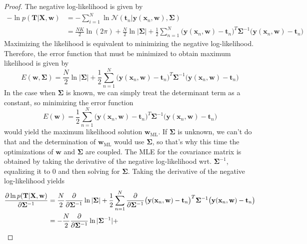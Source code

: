 \begin{proof}
    The negative log-likelihood is given by
    \begin{align*}
    -\ln p(\mathbf{T} | \mathbf{X}, \mathbf{w})
    &= -\sum_{i=1}^{N} \ln \mathcal{N}(\mathbf{t}_n | \mathbf{y}(\mathbf{x}_n, \mathbf{w}), \mathbf{\Sigma}) \\
    &= \frac{NK}{2} \ln(2\pi) + \frac{N}{2} \ln|\mathbf{\Sigma}| 
    + \frac{1}{2}  \sum_{n=1}^{N} \big(\mathbf{y}(\mathbf{x}_n, \mathbf{w}) - \mathbf{t}_n\big)^T
    \mathbf{\Sigma}^{-1}\big(\mathbf{y}(\mathbf{x}_n, \mathbf{w}) - \mathbf{t}_n\big)
    \end{align*}
    Maximizing the likelihood is equivalent to minimizing the negative
    log-likelihood. Therefore, the error function that must be minimized
    to obtain maximum likelihood is given by
    \[
        E(\mathbf{w}, \mathbf{\Sigma}) 
        = \frac{N}{2} \ln|\mathbf{\Sigma}|
        + \frac{1}{2}  \sum_{n=1}^{N} \big(\mathbf{y}(\mathbf{x}_n, \mathbf{w}) - \mathbf{t}_n\big)^T
        \mathbf{\Sigma}^{-1}\big(\mathbf{y}(\mathbf{x}_n, \mathbf{w}) - \mathbf{t}_n\big)
    \] 
    In the case when $\mathbf{\Sigma}$ is known, we can simply treat
    the determinant term as a constant, so minimizing
    the error function
    \[
        E(\mathbf{w}) = 
        \frac{1}{2}  \sum_{n=1}^{N} \big(\mathbf{y}(\mathbf{x}_n, \mathbf{w}) - \mathbf{t}_n\big)^T
        \mathbf{\Sigma}^{-1}\big(\mathbf{y}(\mathbf{x}_n, \mathbf{w}) - \mathbf{t}_n\big)
    \] 
    would yield the maximum likelihood solution $\mathbf{w}_\text{ML}$.
    If $ \mathbf{\Sigma}$ is unknown, we can't do that and the
    determination of $\mathbf{w}_{\text{ML}}$ would use $\mathbf{\Sigma}$,
    so that's why this time the optimizations of $\mathbf{w}$
    and $\mathbf{\Sigma}$ are coupled. The MLE for
    the covariance matrix is obtained by taking the
    derivative of the negative log-likelihood wrt. $\mathbf{\Sigma}^{-1}$, equalizing
    it to 0 and then solving for $\mathbf{\Sigma}$. Taking the
    derivative of the negative log-likelihood yields
    \begin{align*}
        \pdv{\ln p(\mathbf{T} | \mathbf{X}, \mathbf{w})}{\mathbf{\Sigma}^{-1}}
        &= \frac{N}{2} \pdv{\mathbf{\Sigma}^{-1}} \ln |\mathbf{\Sigma}| +
        \frac{1}{2}  \sum_{n=1}^{N} \pdv{\mathbf{\Sigma}^{-1}} 
        \big(\mathbf{y}(\mathbf{x}_n, \mathbf{w}) - \mathbf{t}_n\big)^T
        \mathbf{\Sigma}^{-1}\big(\mathbf{y}(\mathbf{x}_n, \mathbf{w}) - \mathbf{t}_n\big) \\
        &= -\frac{N}{2} \pdv{\mathbf{\Sigma}^{-1}} \ln |\mathbf{\Sigma}^{-1}| +

\end{align*}
\end{proof}
